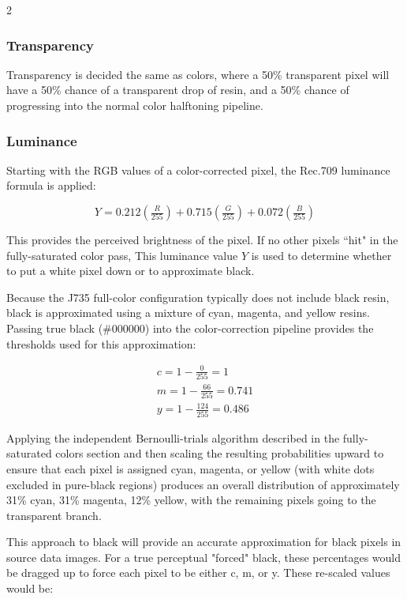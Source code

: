\documentclass{article}
\begin{document}
\begin{multicols}{2}
\subsubsection{Transparency}

Transparency is decided the same as colors, where a 50\% transparent pixel will have a 50\% chance of a transparent drop of resin, and a 50\% chance of progressing into the normal color halftoning pipeline.

\subsubsection{Luminance}

Starting with the RGB values of a color-corrected pixel, the Rec.709 luminance formula is applied:


\[
Y = 0.212\left(\tfrac{R}{255}\right)
  + 0.715\left(\tfrac{G}{255}\right)
  + 0.072\left(\tfrac{B}{255}\right)
\]

This provides the perceived brightness of the pixel. If no other pixels ``hit" in the fully-saturated color pass, This luminance value $Y$ is used to determine whether to put a white pixel down or to approximate black.

Because the J735 full-color configuration typically does not include black resin, black is approximated using a mixture of cyan, magenta, and yellow resins. Passing true black (\#000000) into the color-correction pipeline provides the thresholds used for this approximation:

\[
\begin{array}{l}
c = 1 - \frac{0}{255} = 1 \\[6pt]
m = 1 - \frac{66}{255} = 0.741 \\[6pt]
y = 1 - \frac{124}{255} = 0.486
\end{array}
\]

\noindent
Applying the independent Bernoulli-trials algorithm described in the fully-saturated colors section and then scaling the resulting probabilities upward to ensure that each pixel is assigned cyan, magenta, or yellow (with white dots excluded in pure-black regions) produces an overall distribution of approximately 31\% cyan, 31\% magenta, 12\% yellow, with the remaining pixels going to the transparent branch.

This approach to black will provide an accurate approximation for black pixels in source data images. For a true perceptual "forced" black, these percentages would be dragged up to force each pixel to be either c, m, or y. These re-scaled values would be:


\end{multicols}
\end{document}
